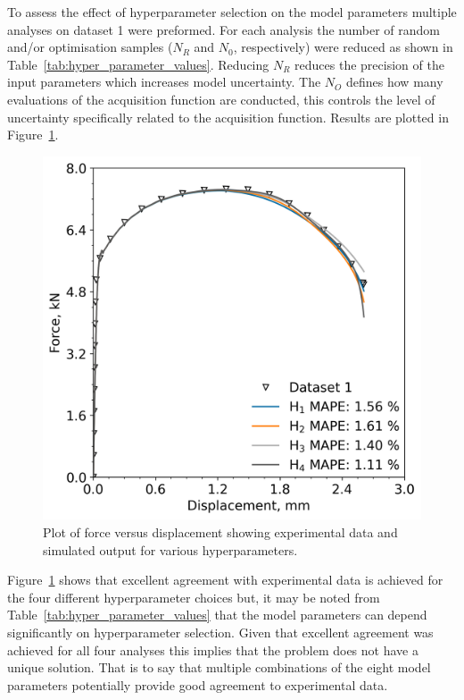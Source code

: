 \documentclass[preprint, review, 12pt]{elsarticle}
\begin{document}
{	To assess the effect of hyperparameter selection on the model parameters multiple analyses on dataset 1 were preformed.
	For each analysis the number of random and/or optimisation samples ($N_R$ and $N_0$, respectively) were reduced as shown in Table~\ref{tab:hyper_parameter_values}.
	Reducing $N_R$ reduces the precision of the input parameters which increases model uncertainty.
	The $N_O$ defines how many evaluations of the acquisition function are conducted, this controls the level of uncertainty specifically related to the acquisition function.
	Results are plotted in Figure~\ref{fig:unique}.
	\begin{figure}[!htbp]
		\centering
		\includegraphics[width=\linewidth, height=0.4\textheight, keepaspectratio]{HYPERPARAMETERS}
		\caption{Plot of force versus displacement showing experimental data and simulated output for various hyperparameters.}
		\label{fig:unique}
	\end{figure}

	


	Figure~\ref{fig:unique} shows that excellent agreement with experimental data is achieved for the four different hyperparameter choices but, it may be noted from Table~\ref{tab:hyper_parameter_values} that the model parameters can depend significantly on hyperparameter selection.
	Given that excellent agreement was achieved for all four analyses this implies that the problem does not have a unique solution.
	That is to say that multiple combinations of the eight model parameters potentially provide good agreement to experimental data.

}
\end{document}
